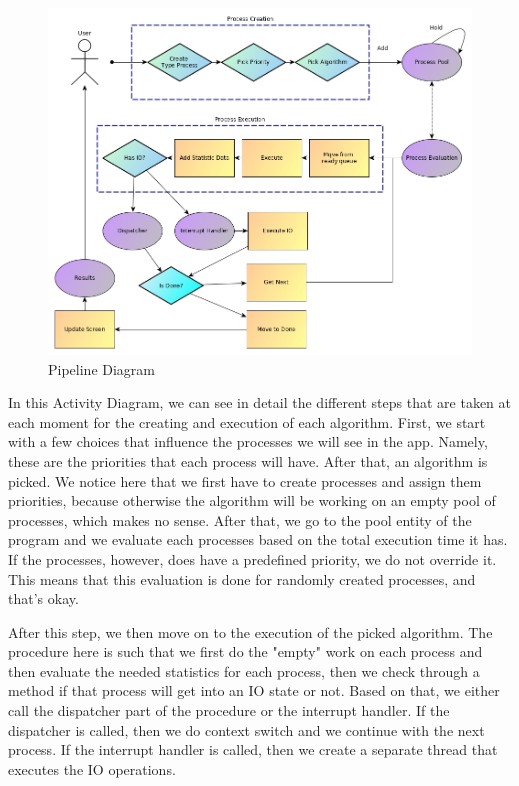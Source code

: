 \documentclass{article}
\begin{document}
\begin{figure}[H]
  \includegraphics[width=\linewidth]{./pics/pipeline.jpg}
  \caption{Pipeline Diagram}
  \label{fig:Pipeline Diagram}
\end{figure}

In this Activity Diagram, we can see in detail the different steps that are taken at each moment for the creating and execution of each algorithm. First, we start with a few choices that influence the processes we will see in the app. Namely, these are the priorities that each process will have. After that, an algorithm is picked. We notice here that we first have to create processes and assign them priorities, because otherwise the algorithm will be working on an empty pool of processes, which makes no sense. After that, we go to the pool entity of the program and we evaluate each processes based on the total execution time it has. If the processes, however, does have a predefined priority, we do not override it. This means that this evaluation is done for randomly created processes, and that's okay.

After this step, we then move on to the execution of the picked algorithm. The procedure here is such that we first do the "empty" work on each process and then evaluate the needed statistics for each process, then we check through a method if that process will get into an IO state or not. Based on that, we either call the dispatcher part of the procedure or the interrupt handler. If the dispatcher is called, then we do context switch and we continue with the next process. If the interrupt handler is called, then we create a separate thread that executes the IO operations.
\end{document}
